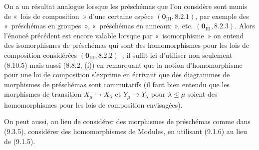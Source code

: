 On a un résultat analogue lorsque les préschémas que l'on considère sont munis
de «~lois de composition~» d'une certaine espèce
$(\mathbf 0_{\mathrm{III}},8.2.1)$, par exemple des «~préschémas en groupes~»,
«~préschémas en anneaux~», etc. $(\mathbf 0_{\mathrm{III}},8.2.3)$. Alors
l'énoncé précédent est encore valable lorsque par «~isomorphisme~» on entend
des isomorphismes de préschémas qui sont des homomorphismes pour les lois de
composition considérées $(\mathbf 0_{\mathrm{III}},8.2.2)$~; il suffit ici
d'utiliser non seulement (8.10.5) mais aussi (8.8.2, (i)) en remarquant que la
notion d'homomorphisme pour une loi de composition s'exprime en écrivant que
des diagrammes de morphismes de préschémas sont commutatifs (il faut bien
entendu que les morphismes de transition $X_\mu\to X_\lambda$ et
$Y_\mu\to Y_\lambda$ pour $\lambda\leqslant\mu$ soient des homomorphismes
pour les lois de composition envisagées).

On peut aussi, au lieu de considérer des morphismes de préschémas comme dans
(9.3.5), considérer des homomorphismes de Modules, en utilisant (9.1.6) au
lieu de (9.1.5).

